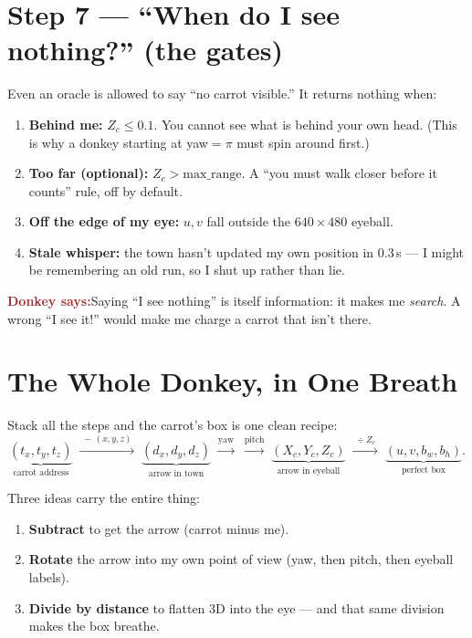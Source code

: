 \documentclass[11pt]{article}
\newcommand{\donkey}[1]{%
  \begin{mdframed}[backgroundcolor=brown!8, linecolor=brown!50, linewidth=1pt,
                   roundcorner=6pt, skipabove=8pt, skipbelow=8pt]
  \textbf{\textcolor{brown}{\large Donkey says:}}\quad #1
  \end{mdframed}}
\begin{document}
\section{Step 7 --- ``When do I see nothing?'' (the gates)}

Even an oracle is allowed to say ``no carrot visible.'' It returns nothing when:
\begin{enumerate}[nosep]
  \item \textbf{Behind me:} $Z_c \le 0.1$. You cannot see what is behind your own
        head. (This is why a donkey starting at yaw$=\pi$ must spin around first.)
  \item \textbf{Too far (optional):} $Z_c > \text{max\_range}$. A ``you must walk
        closer before it counts'' rule, off by default.
  \item \textbf{Off the edge of my eye:} $u,v$ fall outside the
        $640\times480$ eyeball.
  \item \textbf{Stale whisper:} the town hasn't updated my own position in
        $0.3$\,s --- I might be remembering an old run, so I shut up rather than
        lie.
\end{enumerate}

\donkey{Saying ``I see nothing'' is itself information: it makes me \emph{search}.
A wrong ``I see it!'' would make me charge a carrot that isn't there.}

\section{The Whole Donkey, in One Breath}

Stack all the steps and the carrot's box is one clean recipe:
\[
\underbrace{(t_x,t_y,t_z)}_{\text{carrot address}}
\;\xrightarrow{\;-\,(x,y,z)\;}\;
\underbrace{(d_x,d_y,d_z)}_{\text{arrow in town}}
\;\xrightarrow{\text{yaw}}\;
\xrightarrow{\text{pitch}}\;
\underbrace{(X_c,Y_c,Z_c)}_{\text{arrow in eyeball}}
\;\xrightarrow{\;\div Z_c\;}\;
\underbrace{(u,v,b_w,b_h)}_{\text{perfect box}}.
\]

Three ideas carry the entire thing:
\begin{enumerate}[nosep]
  \item \textbf{Subtract} to get the arrow (carrot minus me).
  \item \textbf{Rotate} the arrow into my own point of view (yaw, then pitch, then eyeball labels).
  \item \textbf{Divide by distance} to flatten 3D into the eye --- and that same
        division makes the box breathe.
\end{enumerate}
\end{document}
